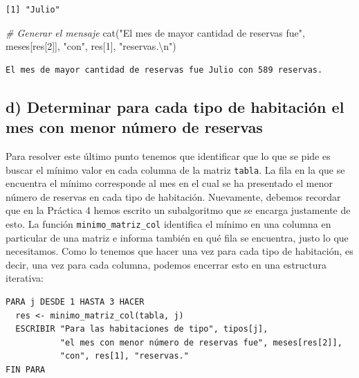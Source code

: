 \documentclass[
]{book}
\newenvironment{Shaded}{\begin{snugshade}}{\end{snugshade}}
\newcommand{\CommentTok}[1]{\textcolor[rgb]{0.56,0.35,0.01}{\textit{#1}}}
\newcommand{\DecValTok}[1]{\textcolor[rgb]{0.00,0.00,0.81}{#1}}
\newcommand{\FunctionTok}[1]{\textcolor[rgb]{0.00,0.00,0.00}{#1}}
\newcommand{\NormalTok}[1]{#1}
\newcommand{\SpecialCharTok}[1]{\textcolor[rgb]{0.00,0.00,0.00}{#1}}
\newcommand{\StringTok}[1]{\textcolor[rgb]{0.31,0.60,0.02}{#1}}
\begin{document}
\begin{verbatim}
[1] "Julio"
\end{verbatim}

\begin{Shaded}
\begin{Highlighting}[]
\CommentTok{\# Generar el mensaje}
\FunctionTok{cat}\NormalTok{(}\StringTok{"El mes de mayor cantidad de reservas fue"}\NormalTok{, meses[res[}\DecValTok{2}\NormalTok{]], }\StringTok{"con"}\NormalTok{, }
\NormalTok{    res[}\DecValTok{1}\NormalTok{], }\StringTok{"reservas.}\SpecialCharTok{\textbackslash{}n}\StringTok{"}\NormalTok{)}
\end{Highlighting}
\end{Shaded}

\begin{verbatim}
El mes de mayor cantidad de reservas fue Julio con 589 reservas.
\end{verbatim}

\hypertarget{d-determinar-para-cada-tipo-de-habitaciuxf3n-el-mes-con-menor-nuxfamero-de-reservas}{%
\subsection{d) Determinar para cada tipo de habitación el mes con menor número de reservas}\label{d-determinar-para-cada-tipo-de-habitaciuxf3n-el-mes-con-menor-nuxfamero-de-reservas}}

Para resolver este último punto tenemos que identificar que lo que se pide es buscar el mínimo valor en cada columna de la matriz \texttt{tabla}. La fila en la que se encuentra el mínimo corresponde al mes en el cual se ha presentado el menor número de reservas en cada tipo de habitación. Nuevamente, debemos recordar que en la Práctica 4 hemos escrito un subalgoritmo que se encarga justamente de esto. La función \texttt{minimo\_matriz\_col} identifica el mínimo en una columna en particular de una matriz e informa también en qué fila se encuentra, justo lo que necesitamos. Como lo tenemos que hacer una vez para cada tipo de habitación, es decir, una vez para cada columna, podemos encerrar esto en una estructura iterativa:

\begin{verbatim}
PARA j DESDE 1 HASTA 3 HACER
  res <- minimo_matriz_col(tabla, j)
  ESCRIBIR "Para las habitaciones de tipo", tipos[j], 
           "el mes con menor número de reservas fue", meses[res[2]], 
           "con", res[1], "reservas."
FIN PARA
\end{verbatim}
\end{document}
